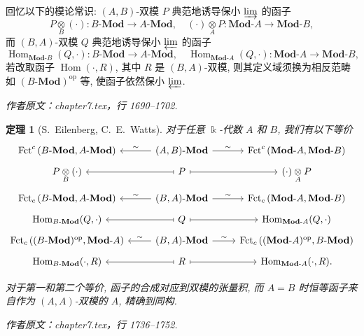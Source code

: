 \documentclass[11pt]{article}
\newcommand{\Hom}{\operatorname{Hom}}
\newcommand{\opp}{\mathrm{op}}
\newcommand{\cated}[1]{\mathbf{#1}\text{-}}
\newcommand{\dcate}[1]{\text{-}\mathbf{#1}}
\newcommand{\dotimes}[1]{\mathbin{\mathop{\otimes}\limits_{#1}}}
\newcommand{\CorpusNumber}{0}
\newtheorem{theorem}{定理}
\theoremstyle{definition}
\begin{document}
回忆以下的模论常识: $(A, B)$-双模 $P$ 典范地诱导保小 $\varinjlim$ 的函子
\[ P \dotimes{B} (\cdot): B\dcate{Mod} \to A\dcate{Mod}, \quad (\cdot) \dotimes{A} P : \cated{Mod}A \to \cated{Mod}B, \]
而 $(B, A)$-双模 $Q$ 典范地诱导保小 $\varprojlim$ 的函子
\[ \Hom_{\cated{Mod}B}(Q, \cdot): B\dcate{Mod} \to A\dcate{Mod}, \quad \Hom_{\cated{Mod}A}(Q, \cdot): \cated{Mod}A \to \cated{Mod}B, \]
若改取函子 $\Hom(\cdot, R)$, 其中 $R$ 是 $(B, A)$-双模, 则其定义域须换为相反范畴如 $(B\dcate{Mod})^{\opp}$ 等, 使函子依然保小 $\varprojlim$.
\par\medskip\noindent\textit{作者原文：chapter7.tex，行 1690--1702.}\par
\begingroup\small
\def\CorpusNumber{7.7.2}
\begin{theorem}[S.\ Eilenberg, C.\ E.\ Watts]\label{prop:Morita}
	对于任意 $\Bbbk$-代数 $A$ 和 $B$, 我们有以下等价
	\[\begin{tikzcd}[row sep=tiny]
		\mathrm{Fct}^c\left(B\dcate{Mod}, A\dcate{Mod}\right) & (A, B)\dcate{Mod} \arrow[l, "\sim"'] \arrow[r, "\sim"] & \mathrm{Fct}^c\left(\cated{Mod}A, \cated{Mod}B\right) \\
		P \dotimes{B} (\cdot) & P \arrow[mapsto, l] \arrow[mapsto, r] & (\cdot) \dotimes{A} P \\
		\mathrm{Fct}_c\left(B\dcate{Mod}, A\dcate{Mod}\right) & (B, A)\dcate{Mod} \arrow[l, "\sim"'] \arrow[r, "\sim"] & \mathrm{Fct}_c\left(\cated{Mod}A, \cated{Mod}B\right) \\
		\Hom_{B\dcate{Mod}}(Q, \cdot) & Q \arrow[mapsto, l] \arrow[mapsto, r] & \Hom_{\cated{Mod}A}(Q, \cdot) \\
		\mathrm{Fct}_c\left((B\dcate{Mod})^{\opp}, \cated{Mod}A \right) & (B, A)\dcate{Mod} \arrow[l, "\sim"'] \arrow[r, "\sim"] & \mathrm{Fct}_c\left((\cated{Mod}A)^{\opp}, B\dcate{Mod}\right) \\
		\Hom_{B\dcate{Mod}}(\cdot, R) & R \arrow[mapsto, l] \arrow[mapsto, r] & \Hom_{\cated{Mod}A}(\cdot, R).
	\end{tikzcd}\]

	对于第一和第二个等价, 函子的合成对应到双模的张量积, 而 $A=B$ 时恒等函子来自作为 $(A, A)$-双模的 $A$, 精确到同构.
\end{theorem}
\endgroup
\par\medskip\noindent\textit{作者原文：chapter7.tex，行 1736--1752.}\par
\def\CorpusNumber{7.7.4}
\end{document}
